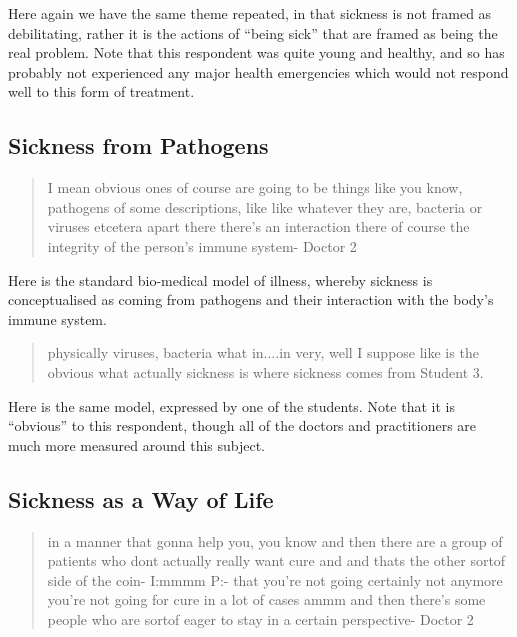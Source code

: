 Here again we have the same theme repeated, in that sickness is not framed as debilitating, rather it is the actions of ``being sick'' that are framed as being the real problem. Note that this respondent was quite young and healthy, and so has probably not experienced any major health emergencies which would not respond well to this form of treatment. 

\subsection{Sickness from Pathogens}
\label{sec:sickn-from-path}

\begin{quotation}
  I mean obvious ones of course are going to be things like you know, pathogens of some descriptions, like like whatever they are, bacteria or viruses etcetera apart there there's an interaction there of course the integrity of the person's immune system-
Doctor 2
\end{quotation}

Here is the standard bio-medical model of illness, whereby sickness is conceptualised as coming from pathogens and their interaction with the body's immune system. 

\begin{quotation}
  physically viruses, bacteria what in....in very, well I suppose like is the obvious what actually sickness is where sickness comes from
Student 3.
\end{quotation}

Here is the same model, expressed by one of the students. Note that it is ``obvious'' to this respondent, though all of the doctors and practitioners are much more measured around this subject. 


\subsection{Sickness as a Way of Life}
\label{sec:sickness-as-way}

\begin{quotation}
   in a manner that gonna help you, you know and then there are a group of patients who dont actually really want cure and and thats the other sortof side of the coin-
I:mmmm
P:- that you're not going certainly not anymore you're not going for cure in a lot of cases ammm and then there's some people who are sortof eager to stay in a certain perspective-
Doctor 2
\end{quotation}


